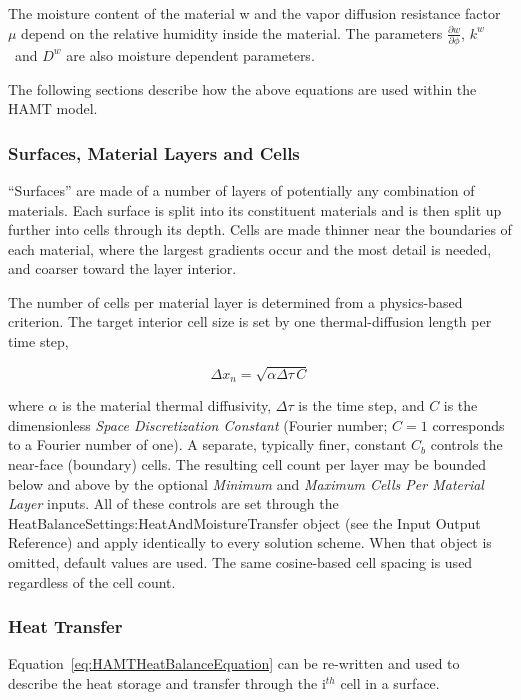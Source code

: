 The moisture content of the material w and the vapor diffusion resistance factor $\mu$ depend on the relative humidity inside the material. The parameters \(\frac{\partial w}{\partial \phi}\), \({k^w}\) ~and \({D^w}\) are also moisture dependent parameters.

The following sections describe how the above equations are used within the HAMT model.

\subsubsection{Surfaces, Material Layers and Cells}\label{surfaces-material-layers-and-cells}

``Surfaces'' are made of a number of layers of potentially any combination of materials. Each surface is split into its constituent materials and is then split up further into cells through its depth. Cells are made thinner near the boundaries of each material, where the largest gradients occur and the most detail is needed, and coarser toward the layer interior.

The number of cells per material layer is determined from a physics-based criterion. The target interior cell size is set by one thermal-diffusion length per time step,

\begin{equation}
\Delta {x_n} = \sqrt {\alpha \Delta \tau \, C}
\end{equation}

where \(\alpha\) is the material thermal diffusivity, \(\Delta \tau\) is the time step, and \(C\) is the dimensionless \emph{Space Discretization Constant} (Fourier number; \(C = 1\) corresponds to a Fourier number of one). A separate, typically finer, constant \(C_b\) controls the near-face (boundary) cells. The resulting cell count per layer may be bounded below and above by the optional \emph{Minimum} and \emph{Maximum Cells Per Material Layer} inputs. All of these controls are set through the HeatBalanceSettings:HeatAndMoistureTransfer object (see the Input Output Reference) and apply identically to every solution scheme. When that object is omitted, default values are used. The same cosine-based cell spacing is used regardless of the cell count.

\subsubsection{Heat Transfer}\label{heat-transfer}

Equation~\ref{eq:HAMTHeatBalanceEquation} can be re-written and used to describe the heat storage and transfer through the i\(^{th}\) cell in a surface.

